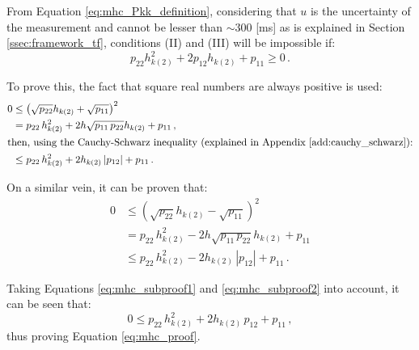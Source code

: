 From Equation \eqref{eq:mhc_Pkk_definition}, considering that $u$ is the uncertainty of the measurement and cannot be lesser than $\sim 300$ [ms] as is explained in Section \ref{ssec:framework_tf}, conditions (II) and (III) will be impossible if:
    \begin{equation}
        p_{22}h_{k(2)}^2 + 2p_{12}h_{k(2)} + p_{11} \geq 0\,. \label{eq:mhc_proof}
    \end{equation}

To prove this, the fact that square real numbers are always positive is used:
    \begin{align}
        \nonumber 0 &\leq \left(\sqrt{p_{22}} h_{k(2)} + \sqrt{p_{11}} \right)^2\\
        \nonumber &= p_{22}\,h_{k(2)}^2 + 2h\sqrt{p_{11}\,p_{22}}h_{k(2)} + p_{11}\,,\\
        \intertext{then, using the Cauchy-Schwarz inequality (explained in Appendix \ref{add:cauchy_schwarz}):}
        &\leq p_{22}\, h_{k(2)}^2 + 2h_{k(2)}\,|p_{12}| + p_{11}\,. \label{eq:mhc_subproof1}
    \end{align}

On a similar vein, it can be proven that:
    \begin{align}
        \nonumber 0 &\leq \left(\sqrt{p_{22}} h_{k(2)} - \sqrt{p_{11}} \right)^2\\
        \nonumber &= p_{22}\,h_{k(2)}^2 - 2h\sqrt{p_{11}\,p_{22}}h_{k(2)} + p_{11}\\
        &\leq p_{22}\, h_{k(2)}^2 - 2h_{k(2)}\,|p_{12}| + p_{11}\,. \label{eq:mhc_subproof2}
    \end{align}

Taking Equations \eqref{eq:mhc_subproof1} and \eqref{eq:mhc_subproof2} into account, it can be seen that:
    \begin{equation*}
        0 \leq p_{22}\, h_{k(2)}^2 + 2h_{k(2)}\,p_{12} + p_{11}\,,
    \end{equation*}
thus proving Equation \eqref{eq:mhc_proof}.



            
